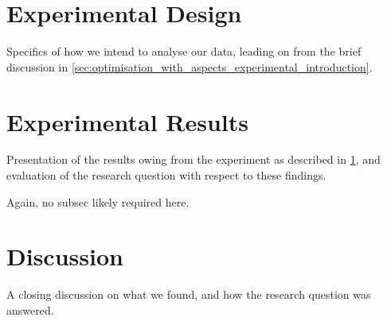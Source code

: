 


\section{Experimental Design}\label{sec:optimisation_with_aspects_experimental_design}

Specifics of how we intend to analyse our data, leading on from the brief
discussion in \cref{sec:optimisation_with_aspects_experimental_introduction}.



\section{Experimental Results}\label{sec:optimisation_with_aspects_experimental_results}

Presentation of the results owing from the experiment as described in
\cref{sec:optimisation_with_aspects_experimental_design}, and evaluation of the
research question with respect to these findings.

Again, no subsec likely required here.

\section{Discussion}\label{sec:optimisation_with_aspects_discussion}

A closing discussion on what we found, and how the research question was
answered.